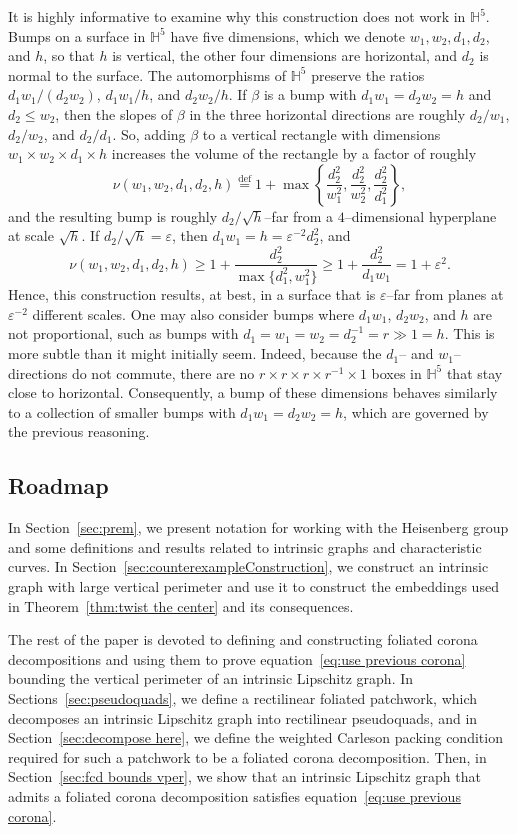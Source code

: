 \documentclass[11pt,reqno]{amsart}
\renewcommand{\H}{\mathbb{H}}
\renewcommand{\epsilon}{\varepsilon}
\newcommand{\0}{\mathbf{0}}
\renewcommand{\1}{\mathbf 1}
\newcommand{\eqdef}{\stackrel{\mathrm{def}}{=}}
\renewcommand{\ge}{\geqslant}
\renewcommand{\le}{\leqslant}
\theoremstyle{remark}
\begin{document}
It is highly informative to examine why  this construction does not work in $\H^5$.  Bumps on a surface in $\H^5$ have five dimensions, which we denote $w_1, w_2, d_1, d_2$, and $h$, so that $h$ is vertical, the other four dimensions are horizontal, and $d_2$ is normal to the surface.  The automorphisms of $\H^5$ preserve the ratios $d_1w_1/ (d_2w_2)$,  $d_1w_1/h$, and $d_2w_2/h$.  If $\beta$ is a bump with $d_1w_1=d_2w_2=h$ and $d_2\le  w_2$, then the slopes of $\beta$ in the three horizontal directions are roughly $d_2/w_1$, $d_2/w_2$, and $d_2/d_1$.  So, adding $\beta$ to a vertical rectangle with dimensions $w_1\times w_2\times d_1\times h$ increases the volume of the rectangle by a factor of roughly
$$\nu(w_1, w_2, d_1, d_2, h)\eqdef 1+ \max\left\{\frac{d^2_2}{w^2_1}, \frac{d^2_2}{w^2_2}, \frac{d^2_2}{d^2_1}\right\},$$
and the resulting bump is roughly $d_2/\sqrt{h}$--far from a $4$--dimensional hyperplane at scale $\sqrt{h}$.  If $d_2/\sqrt{h}=\epsilon$, then $d_1 w_1=h=\epsilon^{-2}d_2^2$, and
$$\nu(w_1, w_2, d_1, d_2, h) \ge 1+ \frac{d^2_2}{\max\{ d_1^2,w^2_1\}} \ge 1+\frac{d_2^2}{d_1 w_1} = 1+ \epsilon^{2}.$$
Hence, this construction results, at best, in a surface that is $\epsilon$--far from planes at $\epsilon^{-2}$ different scales. One may also consider bumps where $d_1 w_1$, $d_2 w_2$, and $h$ are not proportional, such as bumps with $d_1=w_1=w_2=d_2^{-1} =r \gg 1=h$.  This is more subtle than it might initially  seem.  Indeed, because the $d_1$-- and $w_1$--directions do not commute, there are no $r\times r \times r\times r^{-1}\times 1$ boxes in $\H^5$ that stay close to horizontal.  Consequently, a bump of these dimensions behaves similarly to a collection of smaller bumps with $d_1 w_1=d_2 w_2=h$, which are governed by the previous reasoning.



\subsection{Roadmap}

In Section~\ref{sec:prem}, we present notation for working with the Heisenberg group and some definitions and results related to intrinsic graphs and characteristic curves.  In Section~\ref{sec:counterexampleConstruction}, we construct an intrinsic graph with large vertical perimeter and use it to construct the embeddings used in Theorem~\ref{thm:twist the center} and its consequences.

The rest of the paper is devoted to defining and constructing foliated corona decompositions and using them to prove equation~\eqref{eq:use previous corona} bounding the vertical perimeter of an intrinsic Lipschitz graph.  In Sections~\ref{sec:pseudoquads}, we define a rectilinear foliated patchwork, which decomposes an intrinsic Lipschitz graph into rectilinear pseudoquads, and in Section~\ref{sec:decompose here}, we define the weighted Carleson packing condition required for such a patchwork to be a foliated corona decomposition.  Then, in Section~\ref{sec:fcd bounds vper}, we show that an intrinsic Lipschitz graph that admits a foliated corona decomposition satisfies equation~\eqref{eq:use previous corona}.
\end{document}
